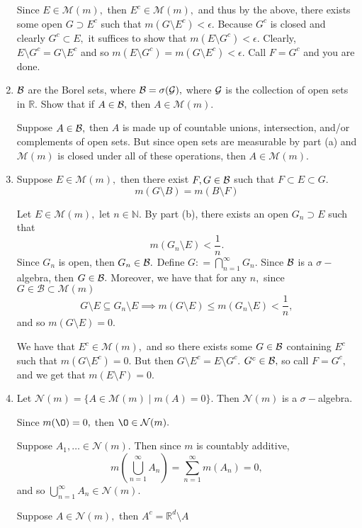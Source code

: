 \documentclass[11pt]{article}
\newcommand{\bbN}{\mathbb{N}}
\newcommand{\bbR}{\mathbb{R}}
\renewcommand{\emptyset}{\O}
\newcommand{\sm}{\setminus}
\begin{document}
\begin{problem}
\begin{enumerate}
\begin{solution}
        Since $E \in \mathcal{M}(m),$ then $E^c \in \mathcal{M}(m),$ and thus by the above, there exists some open $G\supset E^c$ such that $m(G \setminus E^c) < \epsilon.$ Because $G^c$ is closed and clearly $G^c \subset E,$ it suffices to show that $m(E \setminus G^c) < \epsilon.$ Clearly, $E\setminus G^c = G\setminus E^c$ and so $m(E\sm G^c) = m(G \sm E^c) < \epsilon.$ Call $F = G^c$ and you are done.
    \end{solution}
    \item 
    $\cal B$ are the Borel sets, where $\mathcal{B} = \sigma(\cal G),$ where $\cal G$ is the collection of open sets in $\bbR.$ Show that if $A \in \cal B,$ then $A\in \mathcal{M}(m).$
    \begin{solution}
        Suppose $A \in \cal B,$ then $A$ is made up of countable unions, intersection, and/or complements of open sets. But since open sets are measurable by part (a) and $\mathcal{M}(m)$ is closed under all of these operations, then $A \in \mathcal{M}(m).$ 
    \end{solution}
    \item  Suppose $E \in \mathcal{M}(m),$ then there exist $F,G \in \cal B$ such that $F \subset E \subset G.$
    \[m(G\sm B) = m(B\sm F)\]
    \begin{solution}
        Let $E \in \mathcal{M}(m),$ let $n \in \bbN.$ By part (b), there exists an open $G_n\supset E$ such that \[m(G_n \sm E) < \frac{1}{n}.\] Since $G_n$ is open, then $G_n \in \cal B.$ Define $G: = \bigcap_{n=1}^\infty G_n.$ Since $\cal B$ is a $\sigma-$algebra, then $G \in \cal B.$ Moreover, we have that for any $n,$ since $G \in \mathcal{B} \subset \mathcal{M}(m)$
        \[G \sm E \subseteq G_n \sm E \implies m(G \sm E) \leq m(G_n \sm E)< \frac{1}{n},\] and so $m(G \sm E) = 0.$ 

        We have that $E^c \in \mathcal{M}(m),$ and so there exists some $G\in \cal B$ containing $E^c$ such that $m(G\sm E^c) = 0.$ But then $G\sm E^c = E\sm G^c.$ $G^c \in \cal B,$ so call $F = G^c,$ and we get that $m(E \sm F) = 0.$
    \end{solution}
    \item Let $\mathcal{N}(m) = \{A \in \mathcal{M}(m) \mid m(A) = 0\}.$ Then $\mathcal{N}(m)$ is a $\sigma-$algebra.
    \begin{solution}
        Since $m(\emptyset) = 0,$ then $\emptyset \in \mathcal{N}(m).$

        Suppose $A_1, \dots \in \mathcal{N}(m).$ Then since $m$ is countably additive, 
        \[m(\bigcup_{n=1}^\infty A_n) = \sum_{n=1}^\infty m(A_n) = 0,\] and so $\bigcup_{n=1}^\infty A_n \in \mathcal{N}(m).$

        Suppose $A \in \mathcal{N}(m),$ then $A^c = \bbR^d \setminus A$ 
    \end{solution}
    \end{enumerate}

\end{problem}
\end{document}
